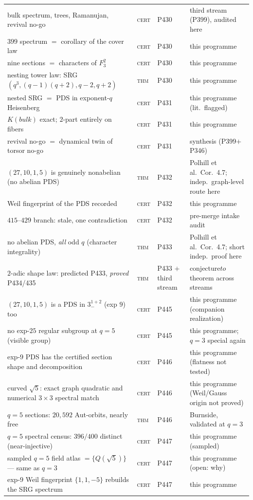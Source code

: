 \documentclass[12pt,a4paper]{article}
\def\mathbb#1{#1}%
\def\mathrm#1{#1}%
\def\mathbf#1{#1}%
\def\textbf#1{#1}%
\def\to{ to }%
\theoremstyle{definition}
\newcommand{\FF}{\mathbb{F}}
\begin{document}
\begin{center}
\begin{tabular}{@{}p{}llp{}@{}}
bulk spectrum, trees, Ramanujan, revival no-go & \textsc{cert} & P430 & third stream (P399), audited here \\
$399$ spectrum $=$ corollary of the cover law & \textsc{cert} & P430 & this programme \\
nine sections $=$ characters of $\FF_3^2$ & \textsc{cert} & P430 & this programme \\
nesting tower law: SRG$(q^3,(q{-}1)(q{+}2),q{-}2,q{+}2)$ & \textsc{thm} & P430 & this programme \\
nested SRG $=$ PDS in exponent-$q$ Heisenberg & \textsc{cert} & P431 & this programme (lit.\ flagged) \\
$K(\mathrm{bulk})$ exact; $2$-part entirely on fibers & \textsc{cert} & P431 & this programme \\
revival no-go $=$ dynamical twin of torsor no-go & \textsc{cert} & P431 & synthesis (P399$+$P346) \\
$(27,10,1,5)$ is genuinely nonabelian (no abelian PDS) & \textsc{thm} & P432 & \textbf{Polhill et al.\ Cor.~4.7}; indep.\ graph-level route here \\
Weil fingerprint of the PDS recorded & \textsc{cert} & P432 & this programme \\
$415$--$429$ branch: stale, one contradiction & \textsc{cert} & P432 & pre-merge intake audit \\
no abelian PDS, \emph{all} odd $q$ (character integrality) & \textsc{thm} & P433 & \textbf{Polhill et al.\ Cor.~4.7}; short indep.\ proof here \\
$2$-adic shape law: predicted P433, \emph{proved} P434/435 & \textsc{thm} & P433 $+$ third stream & conjecture$\to$theorem across streams \\
$(27,10,1,5)$ is a PDS in $3^{1+2}_-$ (exp $9$) too & \textsc{cert} & P445 & this programme (companion realization) \\
no exp-$25$ regular subgroup at $q=5$ (visible group) & \textsc{cert} & P445 & this programme; $q=3$ special again \\
exp-$9$ PDS has the certified section shape and decomposition & \textsc{cert} & P446 & this programme (flatness not tested) \\
curved $\sqrt5$: exact graph quadratic and numerical $3\times3$ spectral match & \textsc{cert} & P446 & this programme (Weil/Gauss origin not proved) \\
$q{=}5$ sections: $20{,}592$ Aut-orbits, nearly free & \textsc{thm} & P446 & Burnside, validated at $q{=}3$ \\
$q{=}5$ spectral census: $396/400$ distinct (near-injective) & \textsc{cert} & P447 & this programme (sampled) \\
sampled $q{=}5$ field atlas $=\{\mathbf Q(\sqrt5)\}$ --- same as $q{=}3$ & \textsc{cert} & P447 & this programme (open: why) \\
exp-$9$ Weil fingerprint $\{1,1,-5\}$ rebuilds the SRG spectrum & \textsc{cert} & P447 & this programme \\
\bottomrule
\end{tabular}
\end{center}
\end{document}

